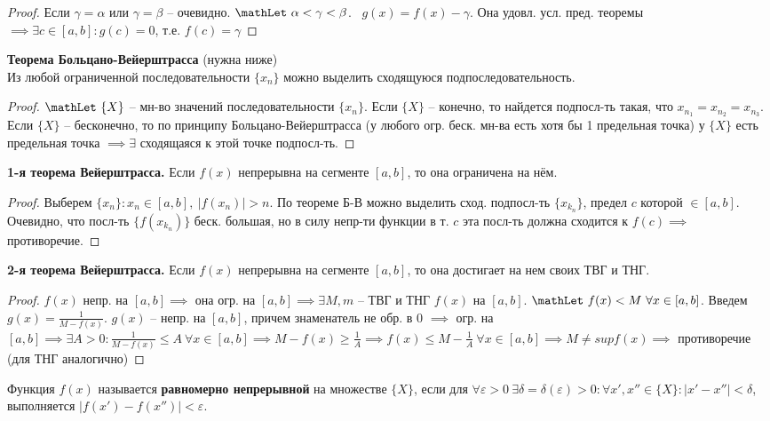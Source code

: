 \begin{proof}
Если $\gamma = \alpha$ или $\gamma = \beta$ -- очевидно. $\mathLet ~ \alpha < \gamma < \beta$. \faEye \ $g(x) = f(x) - \gamma$. Она удовл. усл. пред. теоремы $\implies \exists c \in [a,b]: g(c) = 0$, т.е. $f(c) = \gamma$
\end{proof}

\bigbreak
\textbf{Теорема Больцано-Вейерштрасса} (нужна ниже) \\
Из любой ограниченной последовательности $\{x_n\}$ можно выделить сходящуюся подпоследовательность.

\begin{proof}
$\mathLet ~ \{X\}$ -- мн-во значений последовательности $\{x_n\}$. Если $\{X\}$ -- конечно, то найдется подпосл-ть такая, что $x_{n_1} = x_{n_2} = x_{n_3}$. Если $\{X\}$ -- бесконечно, то по принципу Больцано-Вейерштрасса (у любого огр. беск. мн-ва есть хотя бы 1 предельная точка) у $\{X\}$ есть предельная точка $\implies \exists$ сходящаяся к этой точке подпосл-ть.
\end{proof}

\bigbreak
\textbf{1-я теорема Вейерштрасса.} Если $f(x)$ непрерывна на сегменте $[a,b]$, то она ограничена на нём.

\begin{proof}
Выберем $\{x_n\}: x_n \in [a,b], ~ \left|f(x_n)\right|>n$. По теореме Б-В можно выделить сход. подпосл-ть $\{x_{k_n}\}$, предел $c$ которой $\in [a,b]$. Очевидно, что посл-ть $\{f(x_{k_n})\}$ беск. большая, но в силу непр-ти функции в т. $c$ эта посл-ть должна сходится к $f(c) \implies$ противоречие.
\end{proof}

\bigbreak
\textbf{2-я теорема Вейерштрасса.} Если $f(x)$ непрерывна на сегменте $[a,b]$, то она достигает на нем своих ТВГ и ТНГ. 

\begin{proof}
$f(x)$ непр. на $[a,b] \implies$ она огр. на $[a,b] \implies \exists M, m$ -- ТВГ и ТНГ $f(x)$ на $[a,b]$. $\mathLet ~ f(x) < M ~ \forall x \in [a,b]$. 
Введем $g(x) = \frac{1}{M - f(x)}$. 
$g(x)$ -- непр. на $[a,b]$, причем знаменатель не обр. в 0 $\implies$ огр. на $[a,b] \implies \exists A > 0: \frac{1}{M-f(x)} \leq A ~ \forall x \in [a,b] \implies M -f(x) \geq \frac{1}{A} \implies f(x) \leq M - \frac{1}{A} ~ \forall x \in [a,b] \implies M \neq sup f(x) \implies$ противоречие (для ТНГ аналогично) 
\end{proof}

\bigbreak
Функция $f(x)$ называется \textbf{равномерно непрерывной} на множестве $\{X\}$, если для $ \forall \varepsilon > 0 ~ \exists \delta = \delta(\varepsilon) > 0: \forall x', x'' \in \{X\}: \left|x'-x''\right| < \delta$, выполняется $|f(x') - f(x'')| < \varepsilon$.

